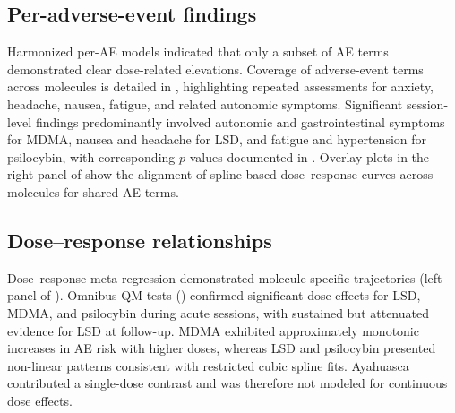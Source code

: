 \subsection{Per-adverse-event findings}
Harmonized per-AE models indicated that only a subset of AE terms demonstrated clear dose-related elevations. Coverage of adverse-event terms across molecules is detailed in , highlighting repeated assessments for anxiety, headache, nausea, fatigue, and related autonomic symptoms. Significant session-level findings predominantly involved autonomic and gastrointestinal symptoms for MDMA, nausea and headache for LSD, and fatigue and hypertension for psilocybin, with corresponding $p$-values documented in . Overlay plots in the right panel of  show the alignment of spline-based dose--response curves across molecules for shared AE terms.



\subsection{Dose--response relationships}
Dose--response meta-regression demonstrated molecule-specific trajectories (left panel of ). Omnibus QM tests () confirmed significant dose effects for LSD, MDMA, and psilocybin during acute sessions, with sustained but attenuated evidence for LSD at follow-up. MDMA exhibited approximately monotonic increases in AE risk with higher doses, whereas LSD and psilocybin presented non-linear patterns consistent with restricted cubic spline fits. Ayahuasca contributed a single-dose contrast and was therefore not modeled for continuous dose effects.

